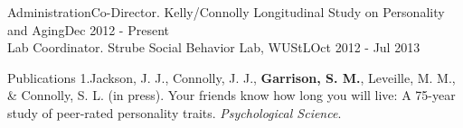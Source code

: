 \documentclass {resume}
\newcommand{\meb}{{\bf Garrison, S. M.}\xspace}
\begin{document}
\begin{samepage}\begin{rSection}{\textrm{Administration}}Co-Director. Kelly/Connolly Longitudinal Study on Personality and Aging\hfill Dec 2012 - Present\smallskip\\
Lab Coordinator. Strube Social Behavior Lab,  WUStL\hfill Oct 2012 - Jul 2013
\end{rSection}\end{samepage}%


\begin{rSection}{\textrm{Publications}}%
1.\hspace* {2.5mm}Jackson, J. J., Connolly, J. J., \meb, Leveille, M. M., \& Connolly, S. L. (in press). Your friends know \hspace* {6 mm}how long you will live: A 75-year study of peer-rated personality traits. \textit{Psychological Science}.\\
\end{rSection}
\end{document}
